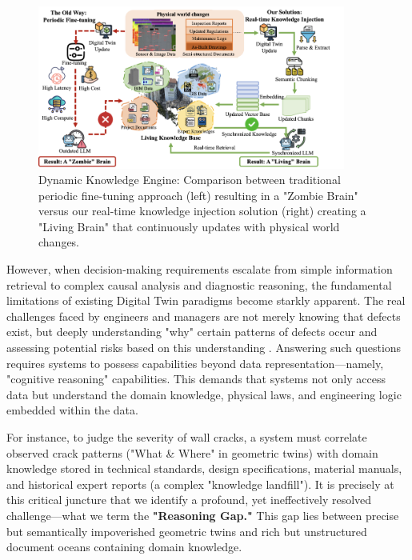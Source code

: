 \begin{figure}[htbp]
\centering
\includegraphics[width=0.9\textwidth]{figures/DefectGPT/Dynamic Knowledge Engine.png}
\caption{Dynamic Knowledge Engine: Comparison between traditional periodic fine-tuning approach (left) resulting in a "Zombie Brain" versus our real-time knowledge injection solution (right) creating a "Living Brain" that continuously updates with physical world changes.}
\label{fig:dynamic-knowledge-engine}
\end{figure}

However, when decision-making requirements escalate from simple information retrieval to complex causal analysis and diagnostic reasoning, the fundamental limitations of existing Digital Twin paradigms become starkly apparent. The real challenges faced by engineers and managers are not merely knowing that defects exist, but deeply understanding "why" certain patterns of defects occur and assessing potential risks based on this understanding \cite{hamdan2021semantic}. Answering such questions requires systems to possess capabilities beyond data representation—namely, "cognitive reasoning" capabilities. This demands that systems not only access data but understand the domain knowledge, physical laws, and engineering logic embedded within the data.

For instance, to judge the severity of wall cracks, a system must correlate observed crack patterns ("What \& Where" in geometric twins) with domain knowledge stored in technical standards, design specifications, material manuals, and historical expert reports (a complex "knowledge landfill"). It is precisely at this critical juncture that we identify a profound, yet ineffectively resolved challenge—what we term the \textbf{"Reasoning Gap."} This gap lies between precise but semantically impoverished geometric twins and rich but unstructured document oceans containing domain knowledge.

